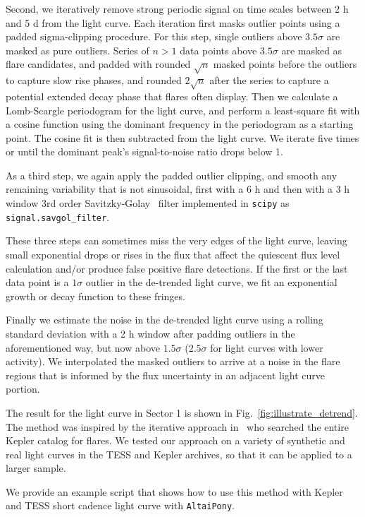 \documentclass[fleqn,usenatbib,letters]{mnras}%
\begin{document}
Second, we iteratively remove strong periodic signal on time scales between 2 h and 5 d from the light curve. Each iteration first masks outlier points using a padded sigma-clipping procedure. For this step, single outliers above $3.5 \sigma$ are masked as pure outliers.  Series of $n>1$ data points above $3.5 \sigma$ are masked as flare candidates, and padded with rounded $\sqrt{n}$ masked points before the outliers to capture slow rise phases, and rounded $2\sqrt{n}$ after the series to capture a potential extended decay phase that flares often display. Then we calculate a Lomb-Scargle periodogram for the light curve, and perform a least-square fit with a cosine function using the dominant frequency in the periodogram as a starting point. The cosine fit is then subtracted from the light curve. We iterate five times or until the dominant peak's signal-to-noise ratio drops below 1. 

As a third step, we again apply the padded outlier clipping, and smooth any remaining variability that is not sinusoidal, first with a 6 h and then with a 3 h window 3rd order Savitzky-Golay~\citep{savitzky1964} filter implemented in \texttt{scipy} as \texttt{signal.savgol\_filter}.

These three steps can sometimes miss the very edges of the light curve, leaving small exponential drops or rises in the flux that affect the quiescent flux level calculation and/or produce false positive flare detections. If the first or the last data point is a $1\sigma$ outlier in the de-trended light curve, we fit an exponential growth or decay function to these fringes.

Finally we estimate the noise in the de-trended light curve using a rolling standard deviation with a 2 h window after padding outliers in the aforementioned way, but now above $1.5 \sigma$ ($2.5 \sigma$ for light curves with lower activity). We interpolated the masked outliers to arrive at a noise in the flare regions that is informed by the flux uncertainty in an adjacent light curve portion.

The result for the light curve in Sector 1 is shown in Fig.~\ref{fig:illustrate_detrend}. The method was inspired by the iterative approach in~\citet{davenport2016} who searched the entire Kepler catalog for flares. We tested our approach on a variety of synthetic and real light curves in the TESS and Kepler archives, so that it can be applied to a larger sample.

We provide an example script that shows how to use this method with Kepler and TESS short cadence light curve with \texttt{AltaiPony}.
\end{document}
